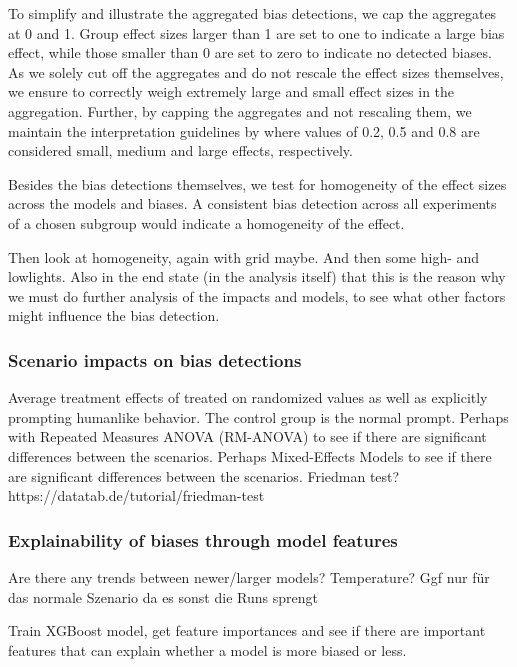 \par To simplify and illustrate the aggregated bias detections, we cap the aggregates at 0 and 1. Group effect sizes larger than 1 are set to one to indicate a large bias effect, while those smaller than 0 are set to zero to indicate no detected biases. 
As we solely cut off the aggregates and do not rescale the effect sizes themselves, we ensure to correctly weigh extremely large and small effect sizes in the aggregation. Further, by capping the aggregates and not rescaling them, we maintain the interpretation guidelines by \textcite{cohen1988statistical} where values of 0.2, 0.5 and 0.8 are considered small, medium and large effects, respectively.

\par Besides the bias detections themselves, we test for homogeneity of the effect sizes across the models and biases. A consistent bias detection across all experiments of a chosen subgroup would indicate a homogeneity of the effect. 

\par Then look at homogeneity, again with grid maybe. And then some high- and lowlights. Also in the end state (in the analysis itself) that this is the reason why we must do further analysis of the impacts and models, to see what other factors might influence the bias detection.



\subsubsection{Scenario impacts on bias detections}
Average treatment effects of treated on randomized values as well as explicitly prompting humanlike behavior. The control group is the normal prompt.
Perhaps with Repeated Measures ANOVA (RM-ANOVA) to see if there are significant differences between the scenarios.
Perhaps Mixed-Effects Models to see if there are significant differences between the scenarios.
Friedman test? https://datatab.de/tutorial/friedman-test

\subsubsection{Explainability of biases through model features}
Are there any trends between newer/larger models?
Temperature? Ggf nur für das normale Szenario da es sonst die Runs sprengt

Train XGBoost model, get feature importances and see if there are important features that can explain whether a model is more biased or less.
